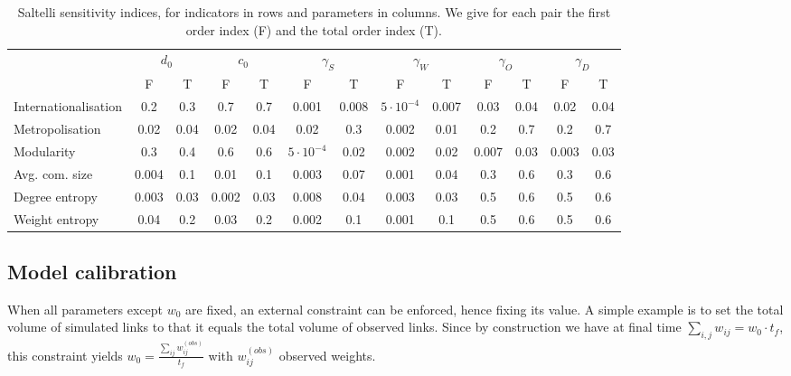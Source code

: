 \begin{table}[h!]
\begin{adjustwidth}{-1.7in}{0in}
\caption{Saltelli sensitivity indices, for indicators in rows and parameters in columns. We give for each pair the first order index (F) and the total order index (T).\label{tab:saltelli}}
\hspace{-1cm}\begin{tabular}{|l|c|c|c|c|c|c|c|c|c|c|c|c|}
\hline
 & \multicolumn{2}{|c|}{$d_0$} & \multicolumn{2}{|c|}{$c_0$} & \multicolumn{2}{|c|}{$\gamma_S$} & \multicolumn{2}{|c|}{$\gamma_W$} & \multicolumn{2}{|c|}{$\gamma_O$} & \multicolumn{2}{|c|}{$\gamma_D$} \\
 & F & T & F & T & F & T & F & T & F & T & F & T \\
 \hline
Internationalisation & 0.2 & 0.3 & 0.7 & 0.7 & 0.001 & 0.008 & $5\cdot 10^{-4}$ & 0.007 & 0.03 & 0.04 & 0.02 & 0.04 \\
Metropolisation & 0.02 & 0.04 & 0.02 & 0.04 & 0.02 & 0.3 & 0.002 & 0.01 & 0.2 & 0.7 & 0.2 & 0.7 \\
Modularity & 0.3 & 0.4 & 0.6 & 0.6 & $5\cdot 10^{-4}$ & 0.02 & 0.002 & 0.02 & 0.007 & 0.03 & 0.003 & 0.03 \\
Avg. com. size & 0.004 & 0.1 & 0.01 & 0.1 & 0.003 & 0.07 & 0.001 & 0.04 & 0.3 & 0.6 & 0.3 & 0.6 \\
Degree entropy & 0.003 & 0.03 & 0.002 & 0.03 & 0.008 & 0.04 & 0.003 & 0.03 & 0.5 & 0.6 & 0.5 & 0.6 \\
Weight entropy & 0.04 & 0.2 & 0.03 & 0.2 & 0.002 & 0.1 & 0.001 & 0.1 & 0.5 & 0.6 & 0.5 & 0.6 \\\hline
\end{tabular}
\end{adjustwidth}
\end{table}


\subsection*{Model calibration}

When all parameters except $w_0$ are fixed, an external constraint can be enforced, hence fixing its value. A simple example is to set the total volume of simulated links to that it equals the total volume of observed links. Since by construction we have at final time $\sum_{i,j} w_{ij} = w_0 \cdot t_f$, this constraint yields $w_0 = \frac{\sum_{ij} w_{ij}^{(obs)}}{t_f}$ with $w_{ij}^{(obs)}$ observed weights.

